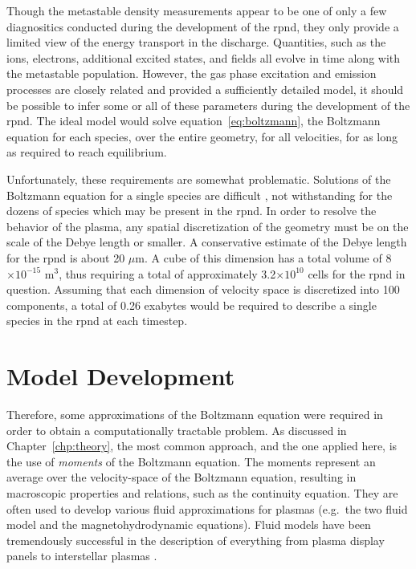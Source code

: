 Though the metastable density measurements appear to be one of only a few
diagnositics conducted during the development of the \acs{rpnd}, they only
provide a limited view of the energy transport in the discharge. Quantities,
such as the ions, electrons, additional excited states, and fields all evolve in
time along with the metastable population. However, the gas phase excitation and
emission processes are closely related and provided a sufficiently detailed
model, it should be possible to infer some or all of these parameters during the
development of the \acs{rpnd}. The ideal model would solve
equation~\ref{eq:boltzmann}, the Boltzmann equation for each species, over the
entire geometry, for all velocities, for as long as required to reach
equilibrium.

Unfortunately, these requirements are somewhat problematic. Solutions of the
Boltzmann equation for a single species are difficult \cite{Lieberman2005}, not
withstanding for the dozens of species which may be present in the \acs{rpnd}.
In order to resolve the behavior of the plasma, any spatial discretization of
the geometry must be on the scale of the Debye length or smaller. A conservative
estimate of the Debye length for the \acs{rpnd} is about 20 $\mu$m. A cube of
this dimension has a total volume of 8$\times10^{-15}$ m$^3$, thus requiring a
total of approximately 3.2$\times10^{10}$ cells for the \acs{rpnd} in question.
Assuming that each dimension of velocity space is discretized into 100
components, a total of 0.26 exabytes would be required to describe a single
species in the \acs{rpnd} at each timestep.

\section{Model Development}

Therefore, some approximations of the Boltzmann equation were required in order
to obtain a computationally tractable problem. As discussed in
Chapter~\ref{chp:theory}, the most common approach, and the one applied here, is
the use of \emph{moments} of the Boltzmann equation. The moments represent an
average over the velocity-space of the Boltzmann equation, resulting in
macroscopic properties and relations, such as the continuity equation. They are
often used to develop various fluid approximations for plasmas \cite{Chen1984}
(e.g.\ the two fluid model and the magnetohydrodynamic equations). Fluid models
have been tremendously successful in the description of everything from plasma
display panels \cite{Rauf1999b} to interstellar plasmas \cite{Linde1998}.

